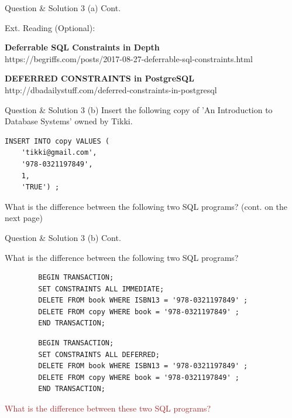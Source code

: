 \begin{frame}[fragile]{Question \& Solution 3 (a) Cont.}
	
Ext. Reading (Optional):\\\vspace{20pt}

\textbf{Deferrable SQL Constraints in Depth}\\
https://begriffs.com/posts/2017-08-27-deferrable-sql-constraints.html\vspace{10pt}

\textbf{DEFERRED CONSTRAINTS in PostgreSQL}\\
http://dbadailystuff.com/deferred-constraints-in-postgresql
\end{frame}

\begin{frame}[fragile]{Question \& Solution 3 (b)}
Insert the following copy of 'An Introduction to Database Systems' owned by Tikki. \vspace{10pt}

\begin{lstlisting}
INSERT INTO copy VALUES (
	'tikki@gmail.com', 
	'978-0321197849', 
	1, 
	'TRUE') ;
\end{lstlisting}

What is the difference between the following two SQL programs? (cont. on the next page)
\end{frame}


\begin{frame}[fragile]{Question \& Solution 3 (b) Cont.}
	
	What is the difference between the following two SQL programs?\vspace{10pt}
	
	\begin{lstlisting}
		BEGIN TRANSACTION;
		SET CONSTRAINTS ALL IMMEDIATE;
		DELETE FROM book WHERE ISBN13 = '978-0321197849' ;
		DELETE FROM copy WHERE book = '978-0321197849' ;
		END TRANSACTION;
	\end{lstlisting}
	
	\begin{lstlisting}
		BEGIN TRANSACTION;
		SET CONSTRAINTS ALL DEFERRED;
		DELETE FROM book WHERE ISBN13 = '978-0321197849' ;
		DELETE FROM copy WHERE book = '978-0321197849' ;
		END TRANSACTION;
	\end{lstlisting}
\textcolor{brown}{What is the difference between these two SQL programs?}
\end{frame}

